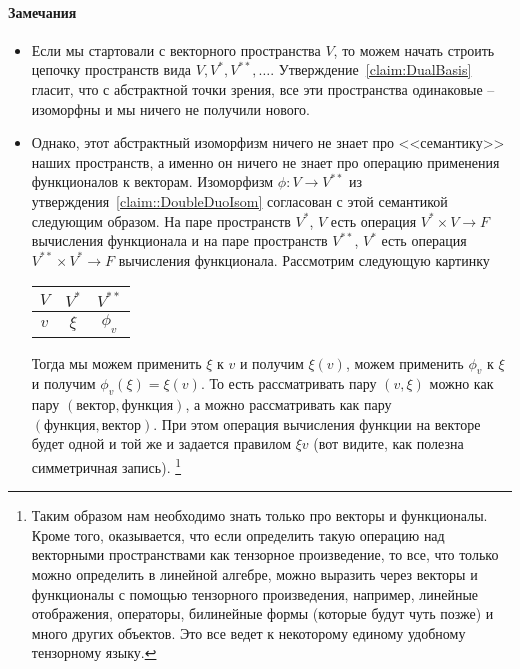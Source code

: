 \paragraph{Замечания}
\begin{itemize}
\item Если мы стартовали с векторного пространства $V$, то можем начать строить цепочку пространств вида $V, V^*, V^{**}, \ldots$.
Утверждение~\ref{claim:DualBasis} гласит, что с абстрактной точки зрения, все эти пространства одинаковые -- изоморфны и мы ничего не получили нового.

\item Однако, этот абстрактный изоморфизм ничего не знает про <<семантику>> наших пространств, а именно он ничего не знает про операцию применения функционалов к векторам.
Изоморфизм $\phi\colon V\to V^{**}$ из утверждения~\ref{claim::DoubleDuoIsom} согласован с этой семантикой следующим образом.
На паре пространств $V^*$, $V$ есть операция $V^*\times V\to F$ вычисления функционала и на паре пространств $V^{**}$, $V^*$ есть операция $V^{**}\times V^*\to F$ вычисления функционала.
Рассмотрим следующую картинку
\begin{center}
\begin{tabular}{c|c|c}

{$V$}&{$V^*$}&{$V^{**}$}\\

\hline

{$v$}&{$\xi$}&{$\phi_v$}\\

\end{tabular}
\end{center}
Тогда мы можем применить $\xi$ к $v$ и получим $\xi(v)$, можем применить $\phi_v$ к $\xi$ и получим $\phi_v(\xi) = \xi(v)$.
То есть рассматривать пару $(v,\xi)$ можно как пару $(\text{вектор}, \text{функция})$, а можно рассматривать как пару $(\text{функция}, \text{вектор})$.
При этом операция вычисления функции на векторе будет одной и той же и задается правилом $\xi v$ (вот видите, как полезна симметричная запись).%
\footnote{Таким образом нам необходимо знать только про векторы и функционалы.
Кроме того, оказывается, что если определить такую операцию над векторными пространствами как тензорное произведение, то все, что только можно определить в линейной алгебре, можно выразить через векторы и функционалы с помощью тензорного произведения, например, линейные отображения, операторы, билинейные формы (которые будут чуть позже) и много других объектов.
Это все ведет к некоторому единому удобному тензорному языку.}


\end{itemize}
